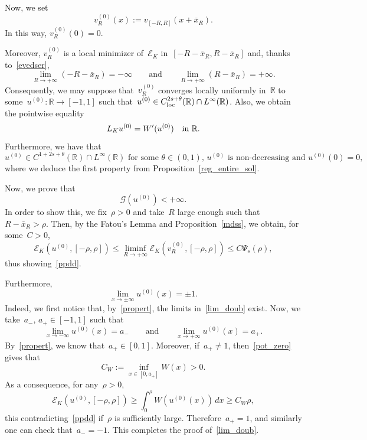 \documentclass[10pt,a4paper]{amsart}
\numberwithin{equation}{section}
\newcommand{\R}{\mathbb{R}}
\newcommand{\Ec}{\mathcal{E}_K}
\begin{document}
Now, we set
\begin{equation*}
v^{(0)}_R(x) :=  v_{[-R,R]}(x+\bar{x}_R).
\end{equation*}
In this way, $v^{(0)}_R(0)=0$. 

Moreover, $v^{(0)}_R$ is a local minimizer of~$\Ec$ in~$[-R-\bar{x}_R,R-\bar{x}_R] $ and, thanks to~\eqref{evedser},
\begin{equation*}
\lim_{R \to +\infty} (-R-\bar{x}_R) = - \infty \qquad\mbox{and}\qquad \lim_{R \to +\infty} (R-\bar{x}_R) = +\infty.
\end{equation*} 
Consequently, we may suppose that~$v^{(0)}_R$ converges locally uniformly in~$\R$ to some~$u^{(0)}:\R \to [-1,1]$ such that~$u^{(0)}\in C_{{\rm loc}}^{2s+\theta}(\R) \cap L^{\infty}(\R)$. Also,
we obtain the pointwise equality
\begin{equation}\label{miser}
{L}_K u^{(0)}= W\rq{}(u^{(0)}) \quad\mbox{in }\R.
\end{equation}
Furthermore, we have that
\begin{equation}\label{propert}
{\mbox{$u^{(0)}\in C^{1+2s+\theta}(\R)\cap L^{\infty}(\R)$ for some~$\theta\in(0,1)$, $u^{(0)}$ is non-decreasing
and~$u^{(0)}(0)=0$,}}
\end{equation}
where we deduce the first property from Proposition~\ref{reg_entire_sol}. 

Now, we prove that
\begin{equation}\label{ppdd}
\mathscr{G}(u^{(0)}) <+\infty.
\end{equation}
In order to show this, we fix~$\rho>0$ and take~$R$ large enough
such that~$R-\bar{x}_R>\rho$. Then, by the Fatou\rq{}s Lemma and Proposition~\ref{mdss}, we obtain, for some~$C>0$,
\begin{equation*}
\Ec(u^{(0)}, [-\rho,\rho]) \leq \liminf_{R \to +\infty} \Ec(v^{(0)}_R, [-\rho,\rho]) \leq C\Psi_s(\rho),
\end{equation*}
thus showing~\eqref{ppdd}. 

Furthermore,
\begin{equation}\label{lim_doub}
\lim_{x \to \pm \infty} u^{(0)}(x)= \pm1.
\end{equation}
Indeed, we first notice that, by~\eqref{propert}, the limits in~\eqref{lim_doub} exist. Now, we take~$a_{-}$,
$a_{+} \in [-1,1]$ such that 
\begin{equation*}
\lim_{x \to -\infty}u^{(0)}(x) = a_{-} \qquad\mbox{and}\qquad \lim_{x \to +\infty}u^{(0)}(x) = a_{+}.
\end{equation*}
By~\eqref{propert}, we know that~$a_{+} \in [0,1]$. Moreover, if~$a_{+}\neq 1$, then~\eqref{pot_zero} gives that
\begin{equation*}
C_W :=\inf_{x \in [0,a_{+}]}W(x)>0.
\end{equation*}
As a consequence, for any~$\rho>0$,
\begin{equation*}
\Ec (u^{(0)}, [-\rho,\rho]) \geq \int_{0}^{\rho}W(u^{(0)}(x)) \, dx \geq C_W \rho,
\end{equation*}
this contradicting~\eqref{ppdd} if~$\rho$ is sufficiently large.
Therefore~$a_{+}=1$, and similarly one can check that~$a_{-}=-1$. This completes the proof of~\eqref{lim_doub}. 
\end{document}

